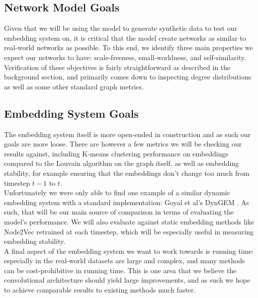 \documentclass[12pt,twoside]{report}
\begin{document}
\subsection{Network Model Goals}

Given that we will be using the model to generate synthetic data to test our embedding system on, it is critical that the model create networks as similar to real-world networks as possible. To this end, we identify three main properties we expect our networks to have: scale-freeness, small-worldness, and self-similarity. Verification of these objectives is fairly straightforward as described in the background section, and primarily comes down to inspecting degree distributions as well as some other standard graph metrics. \\

\subsection{Embedding System Goals}

The embedding system itself is more open-ended in construction and as such our goals are more loose. There are however a few metrics we will be checking our results against, including K-means clustering performance on embeddings compared to the Louvain algorithm \cite{blondel2008fast} on the graph itself, as well as embedding stability, for example ensuring that the embeddings don't change too much from timestep $t-1$ to $t$. \\

Unfortunately we were only able to find one example of a similar dynamic embedding system with a standard implementation: Goyal et al's DynGEM \cite{goyal2018dyngem}. As such, that will be our main source of comparison in terms of evaluating the model's performance. We will also evaluate against static embedding methods like Node2Vec \cite{grover2016node2vec} retrained at each timestep, which will be especially useful in measuring embedding stability. \\

A final aspect of the embedding system we want to work towards is running time: especially in the real-world datasets are large and complex, and many methods can be cost-prohibitive in running time. This is one area that we believe the convolutional architecture should yield large improvements, and as such we hope to achieve comparable results to existing methods much faster. \\
\end{document}

